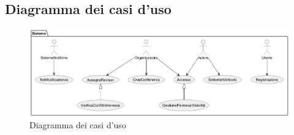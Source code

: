 \subsection{Diagramma dei casi d'uso}
\label{sec:diagramma_casi_uso}

\begin{figure}[!ht]
  \centering
  \includegraphics[width=\linewidth]{./VisualParadigm/diagramma_uso.png}
  \caption{Diagramma dei casi d'uso}
  \label{fig:diagramma_uso}
\end{figure}


